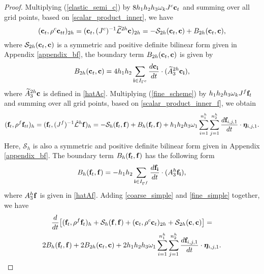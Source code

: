 \begin{proof}
	Multiplying (\ref{elastic_semi_c}) by $8h_1h_2h_3\omega_kJ^{c}{\bf c}_t$ and summing over all grid points, based on \eqref{scalar_product_inner}, we have
	\begin{equation}\label{coarse_simple}
	({\bf c}_t, {\rho}^{c}{\bf c}_{tt})_{2h} = ({\bf c}_t,({J^c})^{-1}\wt{\mathcal{L}}^{2h}{\bf c})_{2h} = -\mathcal{S}_{2h}({\bf c}_t,{\bf c}) + B_{2h}({\bf c}_t,{{\bf c}}),
	\end{equation}
	where $\mathcal{S}_{2h}({\bf c}_t,{\bf c})$ is a symmetric and positive definite bilinear form given in Appendix \ref{appendix_bf}, the boundary term $B_{2h} ({\bf c}_t,{\bf c})$ is given by
	\begin{equation}\label{bounary_c1}
	B_{2h} ({\bf c}_t,{\bf c}) = 4h_1h_2\sum_{{\bf i}\in I_{\Gamma^c}}\frac{d{\bf c}_{\bf i}}{dt}\cdot (\wt{A}_3^{2h}{\bf c}_{\bf i}),
	\end{equation}
	where $\widetilde{A}_3^{2h} {\bf c}$ is defined in \eqref{hatAc}. Multiplying (\ref{fine_scheme}) by $h_1h_2h_3\omega_kJ^f{\bf f}_t$ and summing over all grid points, based on \eqref{scalar_product_inner_f}, we obtain
	\begin{equation}\label{fine_simple}
	({\bf f}_t, {\rho}^f{\bf f}_{tt})_h = ({\bf f}_t,({J^f})^{-1}\hat{\mathcal{L}}^h{\bf f})_h = -\mathcal{S}_{h}({\bf f}_t,{\bf f}) + B_h({\bf f}_t,{\bf f}) 
	+h_1h_2h_3\omega_1\sum_{i = 1}^{n_1^h}\sum_{j=1}^{n_2^h} \frac{d{\bf f}_{i,j,1}}{dt}\cdot{\bm \eta}_{i,j,1}.
	\end{equation}
Here, $\mathcal{S}_h$ is also a symmetric and positive definite bilinear form given in Appendix \ref{appendix_bf}. The boundary term $B_h ({\bf f}_t,{\bf f})$ has the following form
	\begin{equation}\label{boundary_f1}
	B_h ({\bf f}_t,{\bf f}) = -h_1h_2\sum_{{\bf i}\in I_{\Gamma^f}}\frac{d{\bf f}_{\bf i}}{dt}\cdot(A_3^h {\bf f}_{\bf i}),
	\end{equation}
	where $A_3^h {\bf f}$ is given in \eqref{hatAf}. Adding \eqref{coarse_simple} and \eqref{fine_simple} together, we have
	\begin{multline}\label{semi_energy_1}
	\frac{d}{dt}\big[({\bf f}_t,\rho^f {\bf f}_t)_h + \mathcal{S}_{h}({\bf f},{\bf f}) + ({\bf c}_t,\rho^{c} {\bf c}_t)_{2h} + \mathcal{S}_{2h}({\bf c},{\bf c}) \big]  = \\
	2B_{h}({\bf f}_t,{\bf f}) + 2B_{2h}({\bf c}_t,{\bf c}) + 2h_1h_2h_3\omega_1\sum_{i = 1}^{n_1^h}\sum_{j=1}^{n_2^h}\frac{d{\bf f}_{i,j,1}}{dt}\cdot{\bm \eta}_{i,j,1}.
	\end{multline}

\end{proof}
